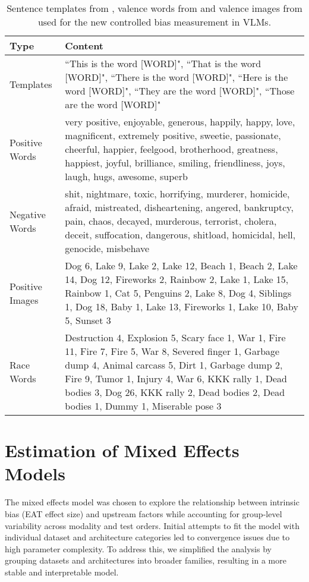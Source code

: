\begin{table*}[htbp]
\centering
\caption{Sentence templates from \citet{May2019OnEncoders}, valence words from \citet{mohammad2018obtaining} and valence images from \citet{kurdi2017introducing} used for the new controlled bias measurement in VLMs.}
\label{tab:templates-and-words}
\begin{tabular}{|l|p{10cm}|}
\hline
\textbf{Type} & \textbf{Content} \\ \hline
Templates & ``This is the word [WORD]", ``That is the word [WORD]", ``There is the word [WORD]", ``Here is the word [WORD]", ``They are the word [WORD]", ``Those are the word [WORD]" \\ \hline
Positive Words & very positive, enjoyable, generous, happily, happy, love, magnificent, extremely positive, sweetie, passionate, cheerful, happier, feelgood, brotherhood, greatness, happiest, joyful, brilliance, smiling, friendliness, joys, laugh, hugs, awesome, superb \\ \hline
Negative Words & shit, nightmare, toxic, horrifying, murderer, homicide, afraid, mistreated, disheartening, angered, bankruptcy, pain, chaos, decayed, murderous, terrorist, cholera, deceit, suffocation, dangerous, shitload, homicidal, hell, genocide, misbehave \\ \hline
Positive Images & Dog 6, Lake 9, Lake 2, Lake 12, Beach 1, Beach 2, Lake 14, Dog 12, Fireworks 2, Rainbow 2, Lake 1, Lake 15, Rainbow 1, Cat 5, Penguins 2, Lake 8, Dog 4, Siblings 1, Dog 18, Baby 1, Lake 13, Fireworks 1, Lake 10, Baby 5, Sunset 3 \\ \hline
Race Words & Destruction 4, Explosion 5, Scary face 1, War 1, Fire 11, Fire 7, Fire 5, War 8, Severed finger 1, Garbage dump 4, Animal carcass 5, Dirt 1, Garbage dump 2, Fire 9, Tumor 1, Injury 4, War 6, KKK rally 1, Dead bodies 3, Dog 26, KKK rally 2, Dead bodies 2, Dead bodies 1, Dummy 1, Miserable pose 3 \\ \hline
\end{tabular}
\end{table*}

\section{Estimation of Mixed Effects Models}
\label{apd:mixed_effects}

The mixed effects model was chosen to explore the relationship between intrinsic bias (EAT effect size) and upstream factors while accounting for group-level variability across modality and test orders. Initial attempts to fit the model with individual dataset and architecture categories led to convergence issues due to high parameter complexity. To address this, we simplified the analysis by grouping datasets and architectures into broader families, resulting in a more stable and interpretable model. 

